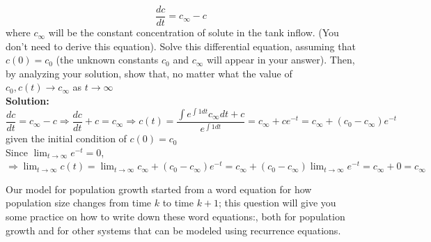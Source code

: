 \documentclass[addpoints, 11pt]{exam}
\begin{document}
\begin{questions}
\begin{parts}
$$
\frac{d c}{d t}=c_{\infty}-c
$$
where $c_{\infty}$ will be the constant concentration of solute in the tank inflow. (You don't need to derive this equation). Solve this differential equation, assuming that $c(0)=c_0$ (the unknown constants $c_0$ and $c_{\infty}$ will appear in your answer). Then, by analyzing your solution, show that, no matter what the value of $c_0, c(t) \rightarrow c_{\infty}$ as $t \rightarrow \infty$\\
\textbf{Solution:}
$$
\frac{d c}{d t}=c_{\infty}-c\Rightarrow \frac{d c}{d t}+c=c_{\infty}\Rightarrow c(t)=\frac{\int e^{\int 1dt}c_{\infty}dt+c}{e^{\int 1 dt}}=c_\infty+ce^{-t}=c_\infty+(c_0-c_\infty)e^{-t}
$$
given the initial condition of $c(0)=c_0$\\
Since $\lim_{t\rightarrow\infty}e^{-t}=0$,\\
$\displaystyle \Rightarrow \lim_{t\rightarrow\infty}c(t)=\lim_{t\rightarrow\infty}c_\infty+(c_0-c_\infty)e^{-t}=c_\infty+(c_0-c_\infty)\lim_{t\rightarrow\infty}e^{-t}=c_\infty+0=c_\infty$
\end{parts}
\question Our model for population growth started from a word equation for how population size changes from time $k$ to time $k + 1$; this question will give you some practice on how to write down these word equations:, both for population growth and for other systems that can be modeled using recurrence equations.\\


\end{questions}
\end{document}
